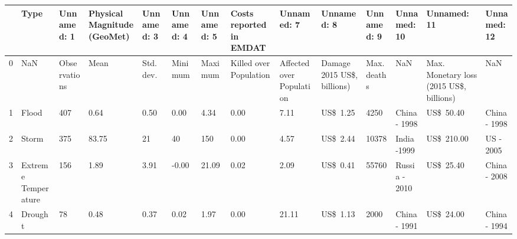 \begin{tabular}{llllllllllllll}
\toprule
{} &                 Type &    Unnamed: 1 & Physical Magnitude (GeoMet) & Unnamed: 3 & Unnamed: 4 & Unnamed: 5 & Costs reported in EMDAT &                 Unnamed: 7 &                  Unnamed: 8 &   Unnamed: 9 &    Unnamed: 10 &                              Unnamed: 11 &   Unnamed: 12 \\
\midrule
0 &                  NaN &  Observations &                        Mean &  Std. dev. &    Minimum &    Maximum &  Killed over Population &  Affected over Population  &  Damage 2015 US\$, billions) &  Max. deaths &            NaN &  Max. Monetary loss (2015 US\$, billions) &           NaN \\
1 &                Flood &           407 &                        0.64 &       0.50 &       0.00 &       4.34 &                    0.00 &                       7.11 &                    US\$ 1.25 &         4250 &   China - 1998 &                                US\$ 50.40 &  China - 1998 \\
2 &                Storm &           375 &                       83.75 &         21 &         40 &        150 &                    0.00 &                       4.57 &                    US\$ 2.44 &        10378 &    India -1999 &                               US\$ 210.00 &     US - 2005 \\
3 &  Extreme Temperature &           156 &                        1.89 &       3.91 &      -0.00 &      21.09 &                    0.02 &                       2.09 &                    US\$ 0.41 &        55760 &  Russia - 2010 &                                US\$ 25.40 &  China - 2008 \\
4 &              Drought &            78 &                        0.48 &       0.37 &       0.02 &       1.97 &                    0.00 &                      21.11 &                    US\$ 1.13 &         2000 &   China - 1991 &                                US\$ 24.00 &  China - 1994 \\
\bottomrule
\end{tabular}
